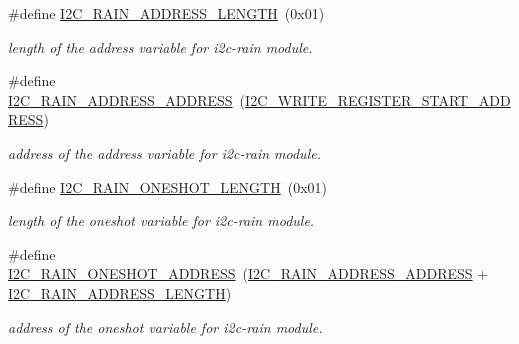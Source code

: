\begin{DoxyCompactItemize}
\mbox{\label{registers-rain_8h_a71aabb131056ec935e30daee63068ca1}} 
\#define \hyperlink{registers-rain_8h_a71aabb131056ec935e30daee63068ca1}{I2\+C\+\_\+\+R\+A\+I\+N\+\_\+\+A\+D\+D\+R\+E\+S\+S\+\_\+\+L\+E\+N\+G\+TH}~(0x01)
\begin{DoxyCompactList}\small\item\em length of the address variable for i2c-\/rain module. \end{DoxyCompactList}\item 
\mbox{\label{registers-rain_8h_a80ceb2e20b5e46f7be4fe67afa070962}} 
\#define \hyperlink{registers-rain_8h_a80ceb2e20b5e46f7be4fe67afa070962}{I2\+C\+\_\+\+R\+A\+I\+N\+\_\+\+A\+D\+D\+R\+E\+S\+S\+\_\+\+A\+D\+D\+R\+E\+SS}~(\hyperlink{registers_8h_ad980dee82f83659f0a84e3e1f3c177bb}{I2\+C\+\_\+\+W\+R\+I\+T\+E\+\_\+\+R\+E\+G\+I\+S\+T\+E\+R\+\_\+\+S\+T\+A\+R\+T\+\_\+\+A\+D\+D\+R\+E\+SS})
\begin{DoxyCompactList}\small\item\em address of the address variable for i2c-\/rain module. \end{DoxyCompactList}\item 
\mbox{\label{registers-rain_8h_ad238c864994f79289ba720ca751b8f7d}} 
\#define \hyperlink{registers-rain_8h_ad238c864994f79289ba720ca751b8f7d}{I2\+C\+\_\+\+R\+A\+I\+N\+\_\+\+O\+N\+E\+S\+H\+O\+T\+\_\+\+L\+E\+N\+G\+TH}~(0x01)
\begin{DoxyCompactList}\small\item\em length of the oneshot variable for i2c-\/rain module. \end{DoxyCompactList}\item 
\mbox{\label{registers-rain_8h_a6fbaaf0f0fcf13291d7a0699ab260d94}} 
\#define \hyperlink{registers-rain_8h_a6fbaaf0f0fcf13291d7a0699ab260d94}{I2\+C\+\_\+\+R\+A\+I\+N\+\_\+\+O\+N\+E\+S\+H\+O\+T\+\_\+\+A\+D\+D\+R\+E\+SS}~(\hyperlink{registers-rain_8h_a80ceb2e20b5e46f7be4fe67afa070962}{I2\+C\+\_\+\+R\+A\+I\+N\+\_\+\+A\+D\+D\+R\+E\+S\+S\+\_\+\+A\+D\+D\+R\+E\+SS} + \hyperlink{registers-rain_8h_a71aabb131056ec935e30daee63068ca1}{I2\+C\+\_\+\+R\+A\+I\+N\+\_\+\+A\+D\+D\+R\+E\+S\+S\+\_\+\+L\+E\+N\+G\+TH})
\begin{DoxyCompactList}\small\item\em address of the oneshot variable for i2c-\/rain module. \end{DoxyCompactList}\item 

\end{DoxyCompactItemize}
